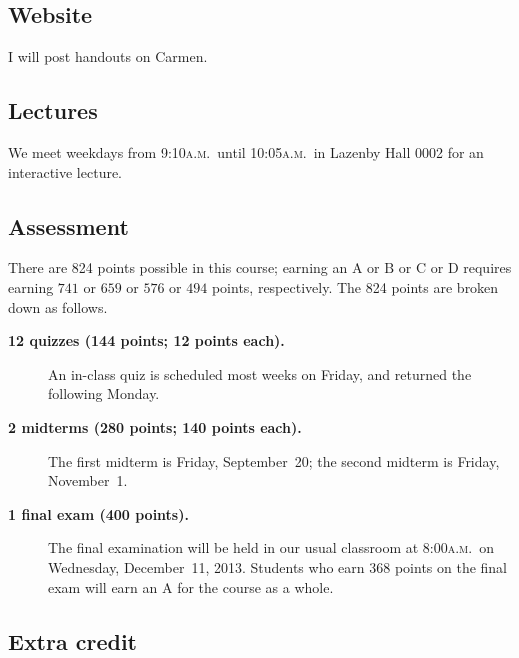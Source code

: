 \documentclass[12pt]{handout}
\newcommand{\ayem}{\textsc{a.m.}}
\begin{document}
\subsection*{Website}

I will post handouts on Carmen.

\subsection*{Lectures}

We meet weekdays from 9:10\ayem\ until 10:05\ayem\ in Lazenby Hall 0002 for an interactive lecture.

\subsection*{Assessment}


There are 824 points possible in this course; earning an $\mathrm{A}$ or $\mathrm{B}$ or $\mathrm{C}$ or $\mathrm{D}$ requires earning $741$ or $659$ or $576$ or $494$ points, respectively.  The 824 points are broken down as follows.

\begin{description}
\item[\textsf{\textbf{12 quizzes (144 points; 12 points each).}}]
  An in-class quiz is scheduled most weeks on Friday, and returned the following Monday.

\item[\textsf{\textbf{2 midterms (280 points; 140 points each).}}]
The first midterm is Friday, September~20; the second midterm is Friday, November~1.

\item[\textsf{\textbf{1 final exam (400 points).}}]  The final examination will be held in our usual classroom at  8:00\ayem\ on Wednesday, December~11, 2013.  Students who earn 368 points on the final exam will earn an $\mathrm{A}$ for the course as a whole.

\end{description}

\vspace{1ex}

\subsection*{Extra credit}
\end{document}
